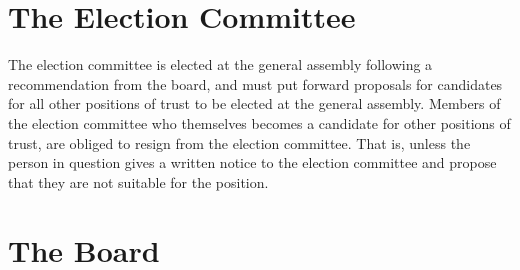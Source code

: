 \documentclass[12pt,a4paper,norsk]{article}
\begin{document}
\section{The Election Committee}

The election committee is elected at the general assembly following a recommendation from the board, and must
put forward proposals for candidates for all other positions of trust to be elected
at the general assembly. Members of the election committee who themselves becomes a candidate for other positions of trust,
are obliged to resign from the election committee. That is, unless the person in question gives a written notice
to the election committee and propose that they are not suitable for the position.


\section{The Board}
\end{document}
